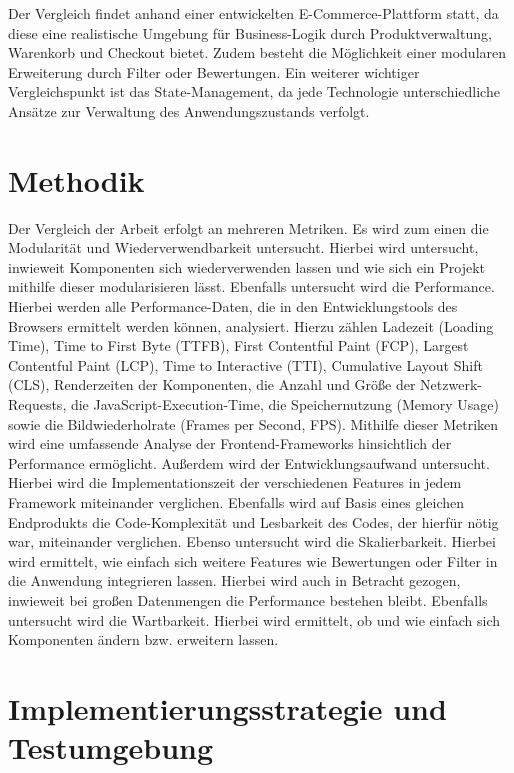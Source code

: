 \documentclass[oneside]{ausarbeitung}
\begin{document}
Der Vergleich findet anhand einer entwickelten E-Commerce-Plattform statt, da diese eine realistische Umgebung für Business-Logik durch Produktverwaltung, Warenkorb und Checkout bietet. Zudem besteht die Möglichkeit einer modularen Erweiterung durch Filter oder Bewertungen. Ein weiterer wichtiger Vergleichspunkt ist das State-Management, da jede Technologie unterschiedliche Ansätze zur Verwaltung des Anwendungszustands verfolgt.

\section{Methodik}
Der Vergleich der Arbeit erfolgt an mehreren Metriken. Es wird zum einen die Modularität und Wiederverwendbarkeit untersucht. Hierbei wird untersucht, inwieweit Komponenten sich wiederverwenden lassen und wie sich ein Projekt mithilfe dieser modularisieren lässt. Ebenfalls untersucht wird die Performance. Hierbei werden alle Performance-Daten, die in den Entwicklungstools des Browsers ermittelt werden können, analysiert. Hierzu zählen Ladezeit (Loading Time), Time to First Byte (TTFB), First Contentful Paint (FCP), Largest Contentful Paint (LCP), Time to Interactive (TTI), Cumulative Layout Shift (CLS), Renderzeiten der Komponenten, die Anzahl und Größe der Netzwerk-Requests, die JavaScript-Execution-Time, die Speichernutzung (Memory Usage) sowie die Bildwiederholrate (Frames per Second, FPS). Mithilfe dieser Metriken wird eine umfassende Analyse der Frontend-Frameworks hinsichtlich der Performance ermöglicht. Außerdem wird der Entwicklungsaufwand untersucht. Hierbei wird die Implementationszeit der verschiedenen Features in jedem Framework miteinander verglichen. Ebenfalls wird auf Basis eines gleichen Endprodukts die Code-Komplexität und Lesbarkeit des Codes, der hierfür nötig war, miteinander verglichen. Ebenso untersucht wird die Skalierbarkeit. Hierbei wird ermittelt, wie einfach sich weitere Features wie Bewertungen oder Filter in die Anwendung integrieren lassen. Hierbei wird auch in Betracht gezogen, inwieweit bei großen Datenmengen die Performance bestehen bleibt. Ebenfalls untersucht wird die Wartbarkeit. Hierbei wird ermittelt, ob und wie einfach sich Komponenten ändern bzw. erweitern lassen.  

\section{Implementierungsstrategie und Testumgebung}
\end{document}
